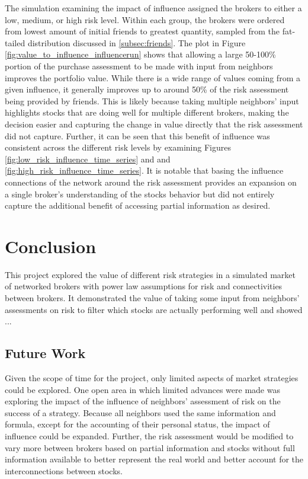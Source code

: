 \documentclass[letterpaper, 11 pt, proceedings]{IEEEtran}
\begin{document}
	The simulation examining the impact of influence assigned the brokers to either a low, medium, or high risk level. Within each group, the brokers were ordered from lowest amount of initial friends to greatest quantity, sampled from the fat-tailed distribution discussed in \ref{subsec:friends}. The plot in Figure \ref{fig:value_to_influence_influencerun} shows that allowing a large 50-100\% portion of the purchase assessment to be made with input from neighbors improves the portfolio value. While there is a wide range of values coming from a given influence, it generally improves up to around 50\% of the risk assessment being provided by friends. This is likely because taking multiple neighbors' input highlights stocks that are doing well for multiple different brokers, making the decision easier and capturing the change in value directly that the risk assessment did not capture. Further, it can be seen that this benefit of influence was consistent across the different risk levels by examining Figures \ref{fig:low_risk_influence_time_series} and  and \ref{fig:high_risk_influence_time_series}. It is notable that basing the influence connections of the network around the risk assessment provides an expansion on a single broker's understanding of the stocks behavior  but did not entirely capture the additional benefit of accessing partial information as desired.
	
	
	\section{Conclusion}\label{sec:conclusion}
	This project explored the value of different risk strategies in a simulated market of networked brokers with power law assumptions for risk and connectivities between brokers. It demonstrated the value of taking some input from neighbors' assessments on risk to filter which stocks are actually performing well and showed ... %
	
	\subsection{Future Work}\label{subsec:futurework}
	Given the scope of time for the project, only limited aspects of market strategies could be explored. One open area in which limited advances were made was exploring the impact of the influence of neighbors' assessment of risk on the success of a strategy. Because all neighbors used the same information and formula, except for the accounting of their personal status, the impact of influence could be expanded. Further, the risk assessment would be modified to vary more between brokers based on partial information and stocks without full information available to better represent the real world and better account for the interconnections between stocks. \par
\end{document}
